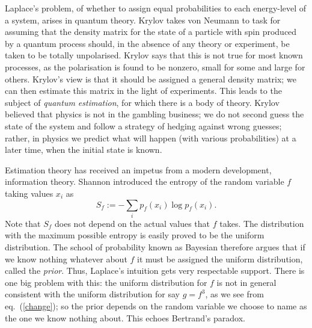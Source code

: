 \documentclass[12pt]{article}
\begin{document}
Laplace's problem, of whether to assign equal probabilities to each
energy-level of a system, arises in quantum theory.
Krylov takes von
Neumann to task for assuming that the density matrix for the state of a
particle with spin produced by a quantum process should, in the absence
of any theory or experiment, be taken to be totally unpolarised. Krylov
says that this is not true for most known processes, as the polarisation
is found to be nonzero, small for some and large for others.
Krylov's view is that it should be assigned
a general density matrix; we can then estimate this matrix in the light of
experiments. This leads to the subject of {\em quantum estimation},
for which there is a body of theory. Krylov
believed that physics is not in the gambling business; we do not second
guess the state of the system and follow a strategy of hedging against
wrong guesses; rather, in physics we predict what will happen (with various
probabilities) at a later time, when the initial state is known.

Estimation theory has received an impetus from a modern development,
information theory.
Shannon introduced the entropy of the random variable $f$ taking values
$x_i$ as
\begin{equation}
S_f:=-\sum_i p_f(x_i)\log p_f(x_i).
\end{equation}
Note that
$S_f$ does not depend on the actual values that $f$ takes. The distribution
with the maximum possible entropy is easily proved to be the uniform
distribution. The school of probability known as Bayesian therefore argues
that if we know nothing whatever about $f$ it must be assigned the uniform
distribution, called the {\em prior}. Thus, Laplace's
intuition gets very respectable support. There is one big problem with this:
the uniform distribution for $f$ is not in general consistent with
the uniform distribution for say $g=f^3$, as we see from eq.~(\ref{change});
so the prior depends on the
random variable we choose to name as the one we know nothing about. This
echoes Bertrand's paradox.
\end{document}
